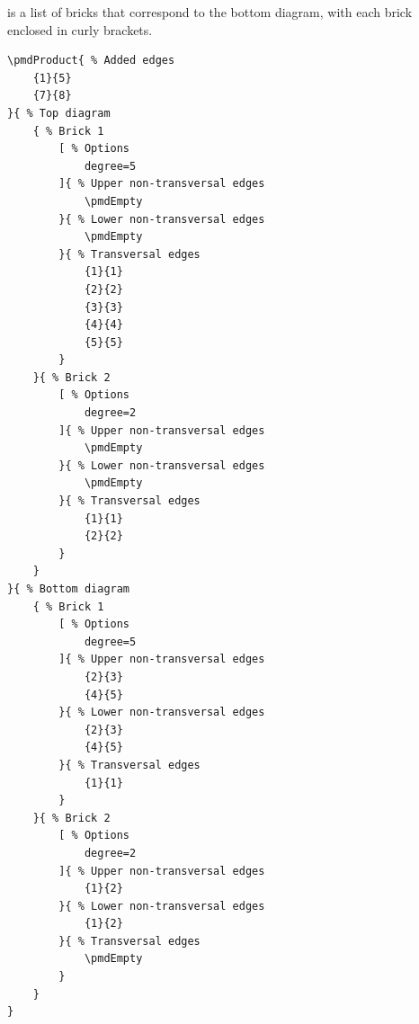 \documentclass{ltxdoc}
\begin{document}
is a list of bricks that correspond to the bottom diagram, with each brick enclosed in curly brackets.
\begin{center}
    \begin{minipage}{\dimexpr0.85\textwidth-2\fboxrule-2\fboxsep\relax}
        \begin{minipage}[c]{0.4\linewidth}
\begin{verbatim}
\pmdProduct{ % Added edges
    {1}{5}
    {7}{8}
}{ % Top diagram
    { % Brick 1
        [ % Options
            degree=5
        ]{ % Upper non-transversal edges
            \pmdEmpty
        }{ % Lower non-transversal edges
            \pmdEmpty
        }{ % Transversal edges
            {1}{1}
            {2}{2}
            {3}{3}
            {4}{4}
            {5}{5}
        }
    }{ % Brick 2
        [ % Options
            degree=2
        ]{ % Upper non-transversal edges
            \pmdEmpty
        }{ % Lower non-transversal edges
            \pmdEmpty
        }{ % Transversal edges
            {1}{1}
            {2}{2}
        }
    }
}{ % Bottom diagram
    { % Brick 1
        [ % Options
            degree=5
        ]{ % Upper non-transversal edges
            {2}{3}
            {4}{5}
        }{ % Lower non-transversal edges
            {2}{3}
            {4}{5}
        }{ % Transversal edges
            {1}{1}
        }
    }{ % Brick 2
        [ % Options
            degree=2
        ]{ % Upper non-transversal edges
            {1}{2}
        }{ % Lower non-transversal edges
            {1}{2}
        }{ % Transversal edges
            \pmdEmpty
        }
    }
}
\end{verbatim}
        \end{minipage}
        \hfill
        \begin{minipage}[c]{0.4\linewidth}
        \end{minipage}
    \end{minipage}%
\end{center}
\begin{center}
\end{center}
\end{document}
